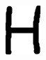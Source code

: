 \documentclass[russian,utf8,emptystyle]{eskdtext}
\begin{document}
\begin{figure}[!htb]
\includegraphics[width=\linewidth]{../data/learn/h/001}
\endminipage\hfill


\end{figure}
\end{document}
